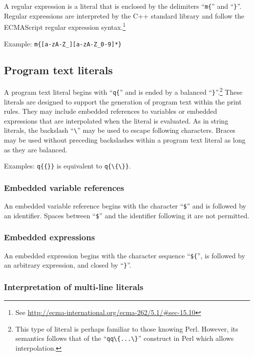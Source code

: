 A regular expression is a literal that is enclosed by the
delimiters ``\lstinline!m{!'' and ``\lstinline!}!''. Regular
expressions are interpreted by the C++ standard library and
follow the ECMAScript regular expression syntax.\footnote{See
\url{http://ecma-international.org/ecma-262/5.1/\#sec-15.10}}

Example: \lstinline!m{[a-zA-Z_][a-zA-Z_0-9]*}!

\subsection{Program text literals}

A program text literal begins with ``\lstinline!q{!'' and
is ended by a balanced ``\lstinline!}!''.\footnote{This
type of literal is perhaps familiar to those knowing Perl.
However, its semantics follows that of the ``\lstinline!qq\{...\}!''
construct in Perl which allows interpolation.}
These literals are designed to support the generation of program text within
the print rules. They may include embedded
references to variables or embedded expressions that are
interpolated when the literal is evaluated. As in
string literals, the backslash ``\lstinline!\!'' may be used to
escape following characters. Braces may be used without preceding
backslashes within a program text literal as long as they are
balanced.

Examples: \lstinline!q{{}}! is equivalent to \lstinline!q{\{\}}!.

\subsubsection{Embedded variable references}

An embedded variable reference begins with the character
``\lstinline!$!''%
and is followed by an identifier. Spaces between
``\lstinline!$!''%
and the identifier following it are not permitted.

\subsubsection{Embedded expressions}

An embedded expression begins with the character sequence
``\lstinline!${!'', %
is followed by an arbitrary expression, and closed by
``\lstinline!}!''.

\subsubsection{Interpretation of multi-line literals}

